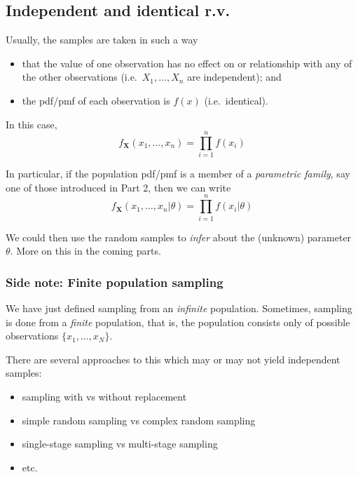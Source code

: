 \documentclass[
]{book}
\providecommand{\tightlist}{%
  \setlength{\itemsep}{0pt}\setlength{\parskip}{0pt}}
\newcommand{\bX}{{\boldsymbol X}}
\theoremstyle{definition}
\theoremstyle{definition}
\theoremstyle{definition}
\theoremstyle{definition}
\theoremstyle{remark}
\begin{document}
\hypertarget{independent-and-identical-r.v.}{%
\subsection{Independent and identical r.v.}\label{independent-and-identical-r.v.}}

Usually, the samples are taken in such a way

\begin{itemize}
\tightlist
\item
  that the value of one observation has no effect on or relationship with any of the other observations (i.e.~\(X_1,\dots,X_n\) are independent); and
\item
  the pdf/pmf of each observation is \(f(x)\) (i.e.~identical).
\end{itemize}

In this case,
\[
f_{\bX}(x_1,\dots,x_n) = \prod_{i=1}^n f(x_i)
\]

In particular, if the population pdf/pmf is a member of a \emph{parametric family}, say one of those introduced in Part 2, then we can write
\[
f_{\bX}(x_1,\dots,x_n|\theta) = \prod_{i=1}^n f(x_i|\theta)
\]

We could then use the random samples to \emph{infer} about the (unknown) parameter \(\theta\). More on this in the coming parts.

\hypertarget{side-note-finite-population-sampling}{%
\subsubsection*{Side note: Finite population sampling}\label{side-note-finite-population-sampling}}

We have just defined sampling from an \emph{infinite} population. Sometimes, sampling is done from a \emph{finite} population, that is, the population consists only of possible observations \(\{x_1,\dots,x_N \}\).

There are several approaches to this which may or may not yield independent samples:

\begin{itemize}
\tightlist
\item
  sampling with vs without replacement
\item
  simple random sampling vs complex random sampling
\item
  single-stage sampling vs multi-stage sampling
\item
  etc.
\end{itemize}
\end{document}

